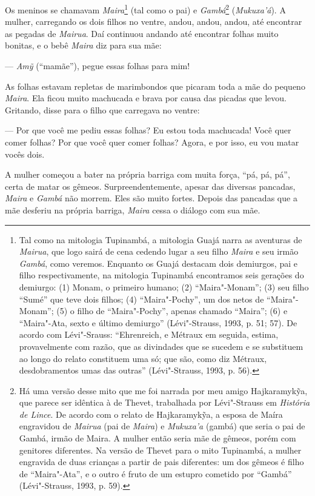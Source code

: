 Os meninos se chamavam \emph{Maira}\footnote{Tal como na mitologia
  Tupinambá, a mitologia Guajá narra as aventuras de \emph{Mairua}, que
  logo sairá de cena cedendo lugar a seu filho \emph{Maira} e seu irmão
  \emph{Gambá}, como veremos. Enquanto os Guajá destacam dois demiurgos,
  pai e filho respectivamente, na mitologia Tupinambá encontramos seis
  gerações do demiurgo: (1) Monam, o primeiro humano; (2) ``Maira"-Monam'';
  (3) seu filho ``Sumé'' que teve dois filhos; (4) ``Maira"-Pochy'', um dos
  netos de ``Maira"-Monam''; (5) o filho de ``Maira"-Pochy'', apenas chamado
  ``Maira''; (6) e ``Maira"-Ata, sexto e último demiurgo'' (Lévi"-Strauss,
  1993, p. 51; 57). De acordo com Lévi"-Srauss: ``Ehrenreich, e Métraux em
      seguida, estima, provavelmente com razão, que as divindades que se
      sucedem e se substituem ao longo do relato constituem uma só; que são,
      como diz Métraux, desdobramentos umas das outras'' (Lévi"-Strauss, 1993,
  p. 56).} (tal como o pai) e \emph{Gambá}\footnote{Há uma versão desse
  mito que me foi narrada por meu amigo Hajkaramykỹa, que parece ser
  idêntica à de Thevet, trabalhada por Lévi"-Strauss em \emph{História de
  Lince}. De acordo com o relato de Hajkaramykỹa, a esposa de Maíra
  engravidou de \emph{Mairua} (pai de \emph{Maira}) e \emph{Mukuxa'a}
  (gambá) que seria o pai de Gambá, irmão de Maira. A mulher então seria
  mãe de gêmeos, porém com genitores diferentes. Na versão de Thevet
  para o mito Tupinambá, a mulher engravida de duas crianças a partir de
  pais diferentes: um dos gêmeos é filho de ``Maira"-Ata'', e o outro é
  fruto de um estupro cometido por ``Gambá'' (Lévi"-Strauss, 1993, p. 59).}
(\emph{Mukuxa'á}). A mulher, carregando os dois filhos no ventre, andou,
andou, andou, até encontrar as pegadas de \emph{Mairua}. Daí continuou
andando até encontrar folhas muito bonitas, e o bebê \emph{Maira} diz
para sua mãe:

--- \emph{Amỹ} (``mamãe''), pegue essas folhas para mim!

As folhas estavam repletas de marimbondos que picaram toda a mãe do
pequeno \emph{Maira}. Ela ficou muito machucada e brava por causa das
picadas que levou. Gritando, disse para o filho que carregava no ventre:

--- Por que você me pediu essas folhas? Eu estou toda machucada! Você quer
comer folhas? Por que você quer comer folhas? Agora, e por isso, eu vou
matar vocês dois.

A mulher começou a bater na própria barriga com muita força, ``pá, pá,
pá'', certa de matar os gêmeos. Surpreendentemente, apesar das diversas
pancadas, \emph{Maira} e \emph{Gambá} não morrem. Eles são muito fortes.
Depois das pancadas que a mãe desferiu na própria barriga, \emph{Maira}
cessa o diálogo com sua mãe.

